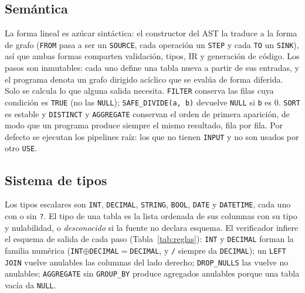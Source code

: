 \documentclass[sigplan,screen,nonacm]{acmart}
\begin{document}
\subsection{Semántica}
La forma lineal es azúcar sintáctica: el constructor del AST la traduce a la forma de grafo
(\texttt{FROM} pasa a ser un \texttt{SOURCE}, cada operación un \texttt{STEP} y cada
\texttt{TO} un \texttt{SINK}), así que ambas formas comparten validación, tipos, IR y
generación de código. Los pasos son inmutables: cada uno define una tabla nueva a partir de
sus entradas, y el programa denota un grafo dirigido acíclico que se evalúa de forma diferida.
Solo se calcula lo que alguna salida necesita. \texttt{FILTER} conserva las filas cuya
condición es \texttt{TRUE} (no las \texttt{NULL}); \texttt{SAFE\_DIVIDE(a, b)} devuelve
\texttt{NULL} si \texttt{b} es 0. \texttt{SORT} es estable y \texttt{DISTINCT} y
\texttt{AGGREGATE} conservan el orden de primera aparición, de modo que un programa produce
siempre el mismo resultado, fila por fila. Por defecto se ejecutan los pipelines raíz: los
que no tienen \texttt{INPUT} y no son usados por otro \texttt{USE}.

\subsection{Sistema de tipos}
Los tipos escalares son \texttt{INT}, \texttt{DECIMAL}, \texttt{STRING}, \texttt{BOOL},
\texttt{DATE} y \texttt{DATETIME}, cada uno con o sin \texttt{?}. El tipo de una tabla es la
lista ordenada de sus columnas con su tipo y nulabilidad, o \emph{desconocido} si la fuente
no declara esquema. El verificador infiere el esquema de salida de cada paso
(Tabla~\ref{tab:reglas}): \texttt{INT} y \texttt{DECIMAL} forman la familia numérica
(\texttt{INT}$\oplus$\texttt{DECIMAL}$=$\texttt{DECIMAL}, y \texttt{/} siempre da
\texttt{DECIMAL}); un \texttt{LEFT JOIN} vuelve anulables las columnas del lado derecho;
\texttt{DROP\_NULLS} las vuelve no anulables; \texttt{AGGREGATE} sin \texttt{GROUP\_BY} produce
agregados anulables porque una tabla vacía da \texttt{NULL}.
\end{document}
